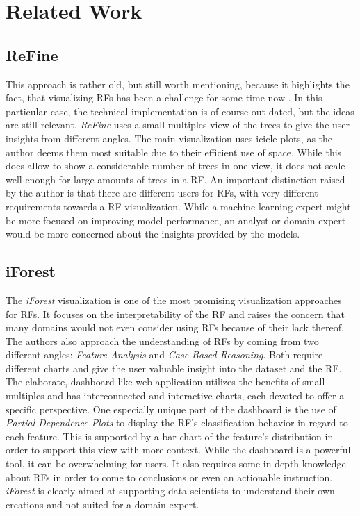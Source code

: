 \documentclass[a4paper, 12pt]{article}
\begin{document}
\section{Related Work}

\subsection{ReFine}
This approach is rather old, but still worth mentioning, because it highlights the fact,
that visualizing RFs has been a challenge for some time now \cite{kuznetsova2014random}.
In this particular case, the technical implementation is of course out-dated, but
the ideas are still relevant. \textit{ReFine} uses a small multiples view of the trees to give the user
insights from different angles. The main visualization uses icicle plots, as the author
deems them most suitable due to their efficient use of space. While this does allow to
show a considerable number of trees in one view, it does not scale well enough for large
amounts of trees in a RF.
An important distinction raised by the author is that there are different users for RFs,
with very different requirements towards a RF visualization. While a machine learning
expert might be more focused on improving model performance, an analyst or domain expert
would be more concerned about the insights provided by the models.

\subsection{iForest}
The \textit{iForest} visualization is one of the most promising visualization approaches for RFs.
\cite{zhao2018iforest} It focuses on the interpretability of the RF and raises the concern
that many domains would not even consider using RFs because of their lack thereof.
The authors also approach the understanding of RFs by coming from two different angles:
\textit{Feature Analysis} and \textit{Case Based Reasoning}.
Both require different charts and give the user valuable insight into the dataset and
the RF. The elaborate, dashboard-like web application utilizes the benefits
of small multiples and has interconnected and interactive charts, each devoted to offer a
specific perspective. One especially unique part of the dashboard is the use of
\textit{Partial Dependence Plots} to display the RF's classification behavior in regard to
each feature. This is supported by a bar chart of the feature's distribution in order to
support this view with more context.
While the dashboard is a powerful tool, it can be overwhelming for users. It also
requires some in-depth knowledge about RFs in order to come to conclusions or even an
actionable instruction. \textit{iForest} is clearly aimed at supporting data scientists to understand
their own creations and not suited for a domain expert.
\end{document}
